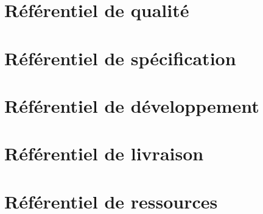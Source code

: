  \section{Référentiel de qualité}
 
  
 \section{Référentiel de spécification}
 
 
  \section{Référentiel de développement}
 
 
  \section{Référentiel de livraison}
 
 
  \section{Référentiel de ressources}
 

